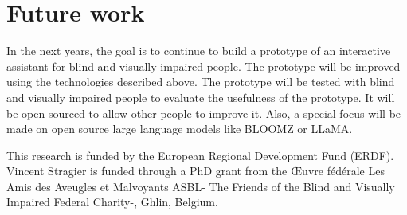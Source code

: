 \documentclass[sigconf]{acmart}
\begin{document}
\section{Future work}
In the next years, the goal is to continue to build a prototype of an interactive assistant for blind and visually impaired people. The prototype will be improved using the technologies described above. The prototype will be tested with blind and visually impaired people to evaluate the usefulness of the prototype. It will be open sourced to allow other people to improve it. Also, a special focus will be made on open source large language models like BLOOMZ or LLaMA.


\begin{acks}
  This research is funded by the European Regional Development Fund (ERDF). Vincent Stragier is funded through a PhD grant from the Œuvre fédérale Les Amis des Aveugles et Malvoyants ASBL- The Friends of the Blind and Visually Impaired Federal Charity-, Ghlin, Belgium.
\end{acks}



\end{document}
